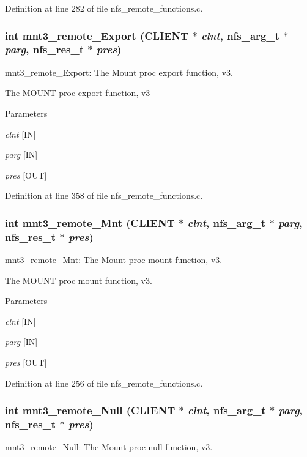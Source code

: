 Definition at line 282 of file nfs\_\-remote\_\-functions.c.
\subsubsection[{mnt3\_\-remote\_\-Export}]{\setlength{\rightskip}{0pt plus 5cm}int mnt3\_\-remote\_\-Export (CLIENT $\ast$ {\em clnt}, \/  nfs\_\-arg\_\-t $\ast$ {\em parg}, \/  nfs\_\-res\_\-t $\ast$ {\em pres})}\label{group__MNTprocs_ga03057430f8bcb74bbec5159f95cde37b}
mnt3\_\-remote\_\-Export: The Mount proc export function, v3.

The MOUNT proc export function, v3


\begin{DoxyParams}{Parameters}
\item[{\em clnt}][IN] \item[{\em parg}][IN] \item[{\em pres}][OUT] \end{DoxyParams}


Definition at line 358 of file nfs\_\-remote\_\-functions.c.
\subsubsection[{mnt3\_\-remote\_\-Mnt}]{\setlength{\rightskip}{0pt plus 5cm}int mnt3\_\-remote\_\-Mnt (CLIENT $\ast$ {\em clnt}, \/  nfs\_\-arg\_\-t $\ast$ {\em parg}, \/  nfs\_\-res\_\-t $\ast$ {\em pres})}\label{group__MNTprocs_gad9f77ceb646cee21165ce3318f0fe54b}
mnt3\_\-remote\_\-Mnt: The Mount proc mount function, v3.

The MOUNT proc mount function, v3.


\begin{DoxyParams}{Parameters}
\item[{\em clnt}][IN] \item[{\em parg}][IN] \item[{\em pres}][OUT] \end{DoxyParams}


Definition at line 256 of file nfs\_\-remote\_\-functions.c.
\subsubsection[{mnt3\_\-remote\_\-Null}]{\setlength{\rightskip}{0pt plus 5cm}int mnt3\_\-remote\_\-Null (CLIENT $\ast$ {\em clnt}, \/  nfs\_\-arg\_\-t $\ast$ {\em parg}, \/  nfs\_\-res\_\-t $\ast$ {\em pres})}\label{group__MNTprocs_ga3d78bf1d679b67f59ef6ce13bef6c202}
mnt3\_\-remote\_\-Null: The Mount proc null function, v3.


